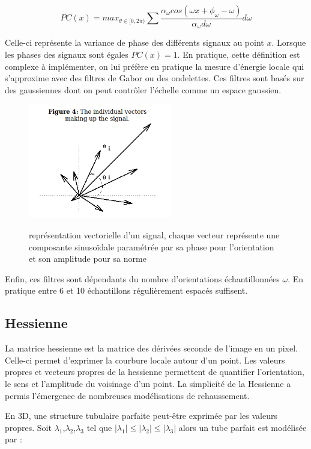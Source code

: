 \begin{equation}
  PC(x) = max_{\theta \in [0,2\pi)} \sum  \frac{ \alpha_{\omega}cos(\omega x + \phi_{\omega} - \omega)  }{ \alpha_{\omega}d \omega } d \omega
\end{equation}

Celle-ci représente la variance de phase des différents signaux au point $x$. Lorsque les phases des signaux sont égales $PC(x)=1$.
En pratique, cette définition est complexe à implémenter, on lui préfère en pratique la mesure d'énergie locale qui s'approxime avec des filtres de Gabor ou des ondelettes. Ces filtres sont basés sur des gaussiennes dont on peut contrôler l'échelle comme un espace gaussien.

\begin{figure}
  \centering
  \includegraphics[height=5cm]{Images/PC_vectors.png}
  \label{fig:phase congruency}
  \caption{représentation vectorielle d'un signal, chaque vecteur représente une composante sinusoïdale paramétrée par sa phase pour l'orientation et son amplitude pour sa norme}
\end{figure}

Enfin, ces filtres sont dépendants du nombre d'orientations échantillonnées $\omega$. En pratique entre 6 et 10 échantillons régulièrement espacés suffisent. 

\subsection{Hessienne}
\label{sec:EA:rehaussement:hessienne}

La matrice hessienne est la matrice des dérivées seconde de l'image en un pixel. Celle-ci permet d'exprimer la courbure locale autour d'un point.
Les valeurs propres et vecteurs propres de la hessienne permettent de quantifier l'orientation, le sens et l'amplitude du voisinage d'un point.
La simplicité de la Hessienne a permis l'émergence de nombreuses modélisations de rehaussement.

En 3D, une structure tubulaire parfaite peut-être exprimée par les valeurs propres. Soit $\lambda_1$,$\lambda_2$,$\lambda_3$ tel que $|\lambda_1| \leq |\lambda_2| \leq |\lambda_3|$ alors un tube parfait est modélisée par :

